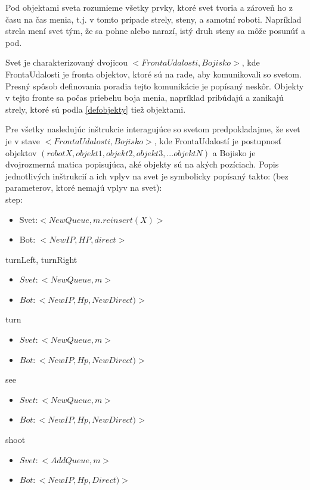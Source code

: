 \begin{definicia} 
Pod objektami sveta rozumieme všetky prvky, ktoré svet tvoria a zároveň ho z času na čas menia, t.j. v tomto prípade strely, steny, a samotní roboti. Napríklad strela mení svet tým, že sa pohne alebo narazí, istý druh steny sa môže posunúť a pod.
\end{definicia}
Svet je charakterizovaný dvojicou $< FrontaUdalosti, Bojisko >$, kde FrontaUdalosti je fronta objektov, ktoré sú na rade, aby komunikovali so svetom. Presný spôsob definovania poradia tejto komunikácie je popísaný neskôr. Objekty v tejto fronte sa počas priebehu boja menia, napríklad pribúdajú a zanikajú strely, ktoré sú podla \ref{defobjekty} tiež objektami.

Pre všetky nasledujúc inštrukcie interagujúce so svetom predpokladajme, že svet je v stave $<FrontaUdalosti, Bojisko>$, kde FrontaUdalostí je postupnosť objektov $(robot X, objekt1, objekt2, objekt3,...objektN)$ a Bojisko je dvojrozmerná matica popisujúca, aké objekty sú na akých pozíciach.
Popis jednotlivých inštrukcií a ich vplyv na svet je symbolicky popísaný takto: (bez parameterov, ktoré nemajú vplyv na svet):\\
\newline
step:\begin {itemize}
\item Svet:$ < NewQueue, m.reinsert(X) > $
\item Bot: $ < NewIP, HP, direct> $
\end {itemize}
turnLeft, turnRight \begin{itemize}
\item $Svet:  <NewQueue, m>$
\item $Bot:  < NewIP, Hp, NewDirect)>$
\end{itemize}
turn  \begin{itemize}
\item $Svet:  < NewQueue, m > $
\item $Bot:   < NewIP, Hp, NewDirect)> $
\end {itemize}
see  \begin{itemize}
\item $Svet:  <NewQueue,m> $
\item $ Bot:  < NewIP, Hp, NewDirect)> $
\end {itemize}
shoot \begin {itemize}
\item $ Svet:  < AddQueue, m> $ 
\item $ Bot:  < NewIP, Hp, Direct)>  $
\end {itemize}
